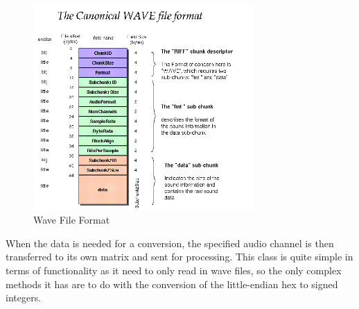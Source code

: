 \documentclass[12pt]{report}
\begin{document}
\begin{figure}[H]
	\centering
	\includegraphics[width=0.75\textwidth]{wav-sound-format.png}
	\caption{Wave File Format}\label{wav_form}
	\centering
\end{figure}

When the data is needed for a conversion, the specified audio channel is then transferred to its own matrix and sent for processing. This class is quite simple in terms of functionality as it need to only read in wave files, so the only complex methods it has are to do with the conversion of the little-endian hex to signed integers.
\end{document}

